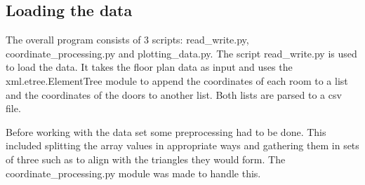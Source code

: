 \subsection{Loading the data}
The overall program consists of 3 scripts: read\_write.py, coordinate\_processing.py and plotting\_data.py.
The script read\_write.py is used to load the data. It takes the floor plan data as input and uses the xml.etree.ElementTree module to append the coordinates of each room to a list and the coordinates of the doors to another list. Both lists are parsed to a csv file.

Before working with the data set some preprocessing had to be done. This included splitting the array values in appropriate ways and gathering them in sets of three such as to align with the triangles they would form. The coordinate\_processing.py module was made to handle this.


